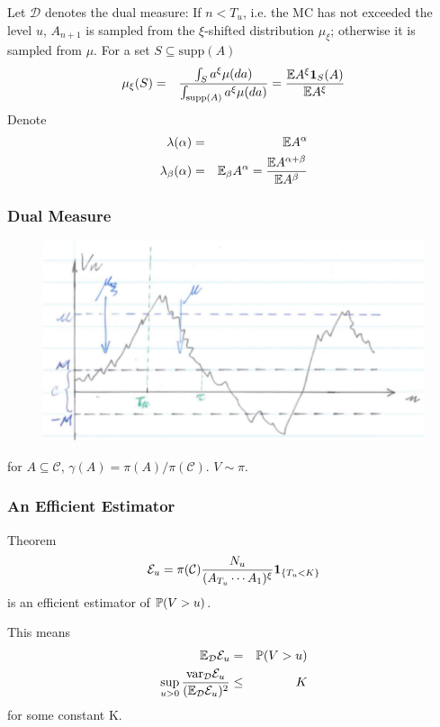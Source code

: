 \documentclass{beamer}
\begin{document}
\begin{frame}
  Let $\mathcal D$ denotes the dual measure:
  If $n < T_u$, i.e. the MC
  has not exceeded the level $u$, $A_{n+1}$ is sampled from the
  $\xi$-shifted distribution $\mu_\xi$; otherwise it is sampled from
  $\mu$. For a set $S \subseteq \text{supp}(A)$
  \begin{eqnarray*}
    \mu_\xi (S) &=& {
      \int_{S} a^\xi \mu(da)
      \over
      \int_{\text{supp}(A)} a^\xi \mu(da)
    } = {\E A^\xi \I{S}(A)
      \over
      \E A^\xi
    }
  \end{eqnarray*}
  Denote
  \begin{eqnarray*}
    \lambda(\alpha) &=& \E A^{\alpha} \\
    \lambda_\beta(\alpha) &=& \E_\beta A^{\alpha} = {
      \E A^{\alpha + \beta}
      \over
      \E A^{\beta}
    }
  \end{eqnarray*}  
\end{frame}

\begin{frame}
  \frametitle{Dual Measure}
  \begin{figure}[htb!]
    \centering
    \includegraphics[scale=0.6]{pic1.pdf}
  \end{figure}
  for $A \subseteq \mathcal C$, $\gamma(A) = \pi(A)/\pi(\mathcal
  C)$. $V \sim \pi$.
\end{frame}

\begin{frame}
  \frametitle{An Efficient Estimator}
  \begin{block}{Theorem}
    \[
    \mathcal E_u = \pi(\mathcal C) {N_u
      \over
      (A_{T_u} \cdots A_1)^\xi
    }\1{T_u < K}
    \]
    is an efficient estimator of $\P(V > u)$.
  \end{block}
  This means
  \begin{eqnarray*}
    \E_{\mathcal D} \mathcal E_u &=& \P(V > u) \\
    \sup_{u > 0} {
      \var_{\mathcal D} \mathcal E_u
      \over
      (\E_{\mathcal D} \mathcal E_u)^2
    } &\leq& K
  \end{eqnarray*}
  for some constant K.
\end{frame}
\end{document}
